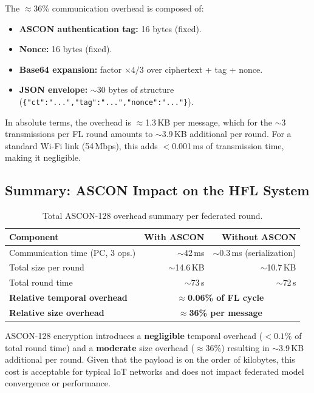 The $\approx$36\% communication overhead is composed of:
\begin{itemize}
    \item \textbf{ASCON authentication tag:} 16 bytes (fixed).
    \item \textbf{Nonce:} 16 bytes (fixed).
    \item \textbf{Base64 expansion:} factor $\times 4/3$ over ciphertext + tag + nonce.
    \item \textbf{JSON envelope:} $\sim$30 bytes of structure (\texttt{\{"ct":"...","tag":"...","nonce":"..."\}}).
\end{itemize}

In absolute terms, the overhead is $\approx$1.3\,KB per message, which for the $\sim$3 transmissions per FL round amounts to $\sim$3.9\,KB additional per round. For a standard Wi-Fi link (54\,Mbps), this adds $<$0.001\,ms of transmission time, making it negligible.

\subsection{Summary: ASCON Impact on the HFL System}

\begin{table}[H]
\centering
\caption{Total ASCON-128 overhead summary per federated round.}
\label{tab:ascon_resumen}
\begin{tabular}{l r r}
\toprule
\textbf{Component} & \textbf{With ASCON} & \textbf{Without ASCON} \\
\midrule
Communication time (PC, 3 ops.)  & $\sim$42\,ms   & $\sim$0.3\,ms (serialization) \\
Total size per round              & $\sim$14.6\,KB & $\sim$10.7\,KB \\
Total round time                  & $\sim$73\,s    & $\sim$72\,s \\
\midrule
\textbf{Relative temporal overhead}  & \multicolumn{2}{c}{\textbf{$\approx$0.06\% of FL cycle}} \\
\textbf{Relative size overhead}      & \multicolumn{2}{c}{\textbf{$\approx$36\% per message}} \\
\bottomrule
\end{tabular}
\end{table}

ASCON-128 encryption introduces a \textbf{negligible} temporal overhead ($< 0.1\%$ of total round time) and a \textbf{moderate} size overhead ($\approx 36\%$) resulting in $\sim$3.9\,KB additional per round. Given that the payload is on the order of kilobytes, this cost is acceptable for typical IoT networks and does not impact federated model convergence or performance.


